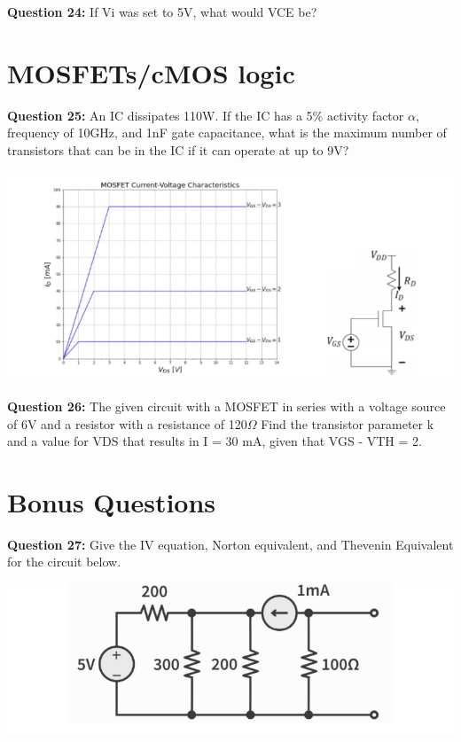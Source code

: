 \documentclass{article}
\begin{document}
\textbf{Question 24:} If Vi was set to 5V, what would VCE be?


\section*{MOSFETs/cMOS logic}
\textbf{Question 25:} An IC dissipates 110W. If the IC has a 5\% activity factor \(\alpha\), frequency of 10GHz, and 1nF gate capacitance, what is the maximum number of transistors that can be in the IC if it can operate at up to 9V?

\begin{center}

        \includegraphics[width=1\linewidth]{figures/78.png}
\end{center}

\textbf{Question 26:} The given circuit with a MOSFET in series with a voltage source of 6V and a resistor with a resistance of 120\(\Omega\)
Find the transistor parameter k and a value for VDS that results in I = 30 mA, given that VGS - VTH = 2.

\section*{Bonus Questions}

\textbf{Question 27:} Give the IV equation, Norton equivalent, and Thevenin Equivalent for the circuit below.

\begin{center}

    \includegraphics[width=0.75\linewidth]{figures/99.png}
\end{center}
\end{document}
